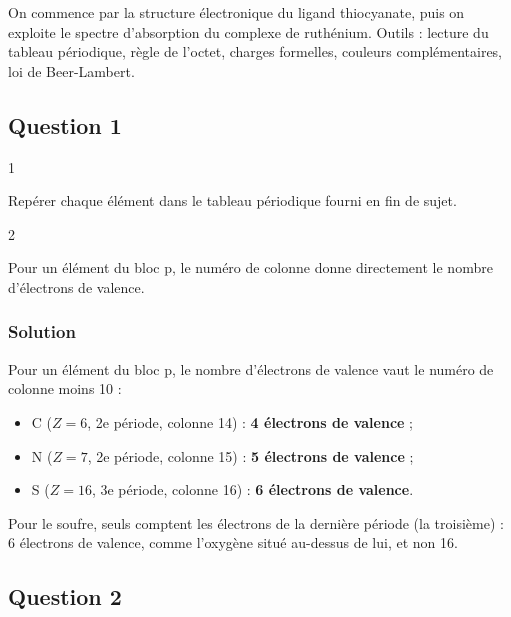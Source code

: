 \documentclass[11pt,a4paper]{article}
\providecommand{\tightlist}{\setlength{\itemsep}{0pt}\setlength{\parskip}{0pt}}
\begin{document}
On commence par la structure électronique du ligand thiocyanate, puis on exploite le spectre d'absorption du complexe de ruthénium. Outils : lecture du tableau périodique, règle de l'octet, charges formelles, couleurs complémentaires, loi de Beer-Lambert.

\hypertarget{question-1}{%
\subsection{Question 1}\label{question-1}}

\begin{indication}{1}

Repérer chaque élément dans le tableau périodique fourni en fin de sujet.

\end{indication}

\begin{indication}{2}

Pour un élément du bloc p, le numéro de colonne donne directement le nombre d'électrons de valence.

\end{indication}

\hypertarget{solution}{%
\subsubsection{Solution}\label{solution}}

Pour un élément du bloc p, le nombre d'électrons de valence vaut le numéro de colonne moins 10 :

\begin{itemize}
\tightlist
\item
  C (\(Z=6\), 2e période, colonne 14) : \textbf{4 électrons de valence} ;
\item
  N (\(Z=7\), 2e période, colonne 15) : \textbf{5 électrons de valence} ;
\item
  S (\(Z=16\), 3e période, colonne 16) : \textbf{6 électrons de valence}.
\end{itemize}

\begin{piege}

Pour le soufre, seuls comptent les électrons de la dernière période (la troisième) : 6 électrons de valence, comme l'oxygène situé au-dessus de lui, et non 16.

\end{piege}

\hypertarget{question-2}{%
\subsection{Question 2}\label{question-2}}
\end{document}
